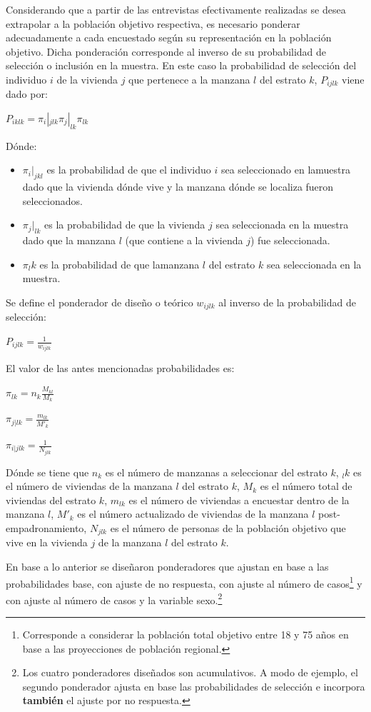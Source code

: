 \documentclass[
]{book}
\providecommand{\tightlist}{%
  \setlength{\itemsep}{0pt}\setlength{\parskip}{0pt}}
\begin{document}
Considerando que a partir de las entrevistas efectivamente realizadas se
desea extrapolar a la población objetivo respectiva, es necesario
ponderar adecuadamente a cada encuestado según su representación en la
población objetivo. Dicha ponderación corresponde al inverso de su
probabilidad de selección o inclusión en la muestra. En este caso la
probabilidad de selección del individuo \(i\) de la vivienda \(j\) que
pertenece a la manzana \(l\) del estrato \(k\), \(P_{ijlk}\) viene dado
por:

\(P_{iklk} = \pi_i|_{jlk}\pi_j|_{lk}\pi_{lk}\)

Dónde:

\begin{itemize}
\tightlist
\item
  \(\pi_i|_{jkl}\) es la probabilidad de que el individuo \(i\) sea
  seleccionado en lamuestra dado que la vivienda dónde vive y la manzana
  dónde se localiza fueron seleccionados.
\item
  \(\pi_j|_{lk}\) es la probabilidad de que la vivienda \(j\) sea
  seleccionada en la muestra dado que la manzana \(l\) (que contiene a
  la vivienda \(j\)) fue seleccionada.
\item
  \(\pi_lk\) es la probabilidad de que lamanzana \(l\) del estrato \(k\)
  sea seleccionada en la muestra.
\end{itemize}

Se define el ponderador de diseño o teórico \(w_{ijlk}\) al inverso de
la probabilidad de selección:

\(P_{ijlk}=\frac{1}{w_{ijlk}}\)

El valor de las antes mencionadas probabilidades es:

\(\pi_{lk} = n_k\frac{M_{kl}}{M_k}\)

\(\pi_{j|lk} = \frac{m_{lk}}{M'_k}\)

\(\pi_{i|jlk} = \frac{1}{N_{jlk}}\)

Dónde se tiene que \(n_k\) es el número de manzanas a seleccionar del
estrato \(k\), \(_lk\) es el número de viviendas de la manzana \(l\) del
estrato \(k\), \(M_k\) es el número total de viviendas del estrato
\(k\), \(m_{lk}\) es el número de viviendas a encuestar dentro de la
manzana \(l\), \(M'_k\) es el número actualizado de viviendas de la
manzana \(l\) post-empadronamiento, \(N_{jlk}\) es el número de personas
de la población objetivo que vive en la vivienda \(j\) de la manzana
\(l\) del estrato \(k\).

En base a lo anterior se diseñaron ponderadores que ajustan en base a
las probabilidades base, con ajuste de no respuesta, con ajuste al
número de casos\footnote{Corresponde a considerar la población total
  objetivo entre 18 y 75 años en base a las proyecciones de población
  regional.} y con ajuste al número de casos y la variable
sexo.\footnote{Los cuatro ponderadores diseñados son acumulativos. A
  modo de ejemplo, el segundo ponderador ajusta en base las
  probabilidades de selección e incorpora \textbf{también} el ajuste por
  no respuesta.}
\end{document}
